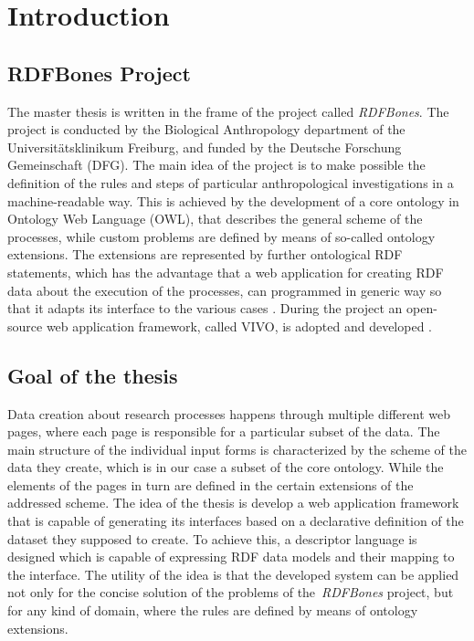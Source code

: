 \chapter{Introduction}


\section{RDFBones Project}

The master thesis is written in the frame of the project called \textit{RDFBones}. The project is conducted by the Biological Anthropology department of the Universitätsklinikum Freiburg, and funded by the Deutsche Forschung Gemeinschaft (DFG). The main idea of the project is to make possible the definition of the rules and steps of particular anthropological investigations in a machine-readable way. This is achieved by the development of a core ontology in Ontology Web Language (OWL), that describes the general scheme of the processes, while custom problems are defined by means of so-called ontology extensions. The extensions are represented by further ontological RDF statements, which has the advantage that a web application for creating RDF data about the execution of the processes, can programmed in generic way so that it adapts its interface to the various cases \cite{infrastructure}. During the project an open-source web application framework, called VIVO, is adopted and developed \cite{DBLP:series/synthesis/2012Borner}.

\section{Goal of the thesis}

Data creation about research processes happens through multiple different web pages, where each page is responsible for a particular subset of the data. The main structure of the individual input forms is characterized by the scheme of the data they create, which is in our case a subset of the core ontology. While the elements of the pages in turn are defined in the certain extensions of the addressed scheme. The idea of the thesis is develop a web application framework that is capable of generating its interfaces based on a declarative definition of the dataset they supposed to create. To achieve this, a descriptor language is designed which is capable of expressing RDF data models  and their mapping to the interface. The utility of the idea is that the developed system can be applied not only for the concise solution of the problems of the \textit{RDFBones} project, but for any kind of domain, where the rules are defined by means of ontology extensions.

